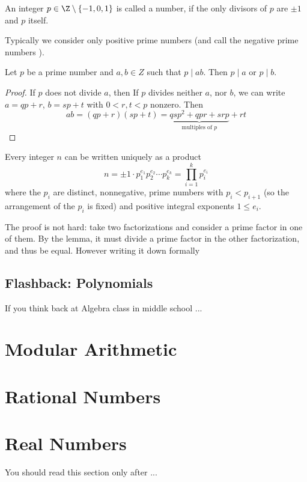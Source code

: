 \begin{defn}
An integer $p\in\Z\setminus\{-1,0,1\}$ is called a  number, if
the only divisors of $p$ are $\pm 1$ and $p$ itself.
\end{defn}
Typically we consider only positive prime numbers (and call the negative
prime numbers ).
\begin{lemma}
Let $p$ be a prime number and $a,b\in Z$ such that $p\mid ab$. Then $p\mid
a$ or $p\mid b$.
\end{lemma}
\begin{proof}
If $p$ does not divide $a$, then
If $p$ divides neither $a$, nor $b$, we can write $a=qp+r$, $b=sp+t$ with
$0<r,t<p$ nonzero. Then
\[
ab=(qp+r)(sp+t)=\underbrace{qsp^2+qpr+srp}_{\mbox{multiples of $p$}}+rt
\]
\end{proof}
\begin{cor}
Every integer $n$ can be written uniquely as a product
\[
n=\pm1\cdot p_1^{e_1}p_2^{e_2}\cdots p_k^{e_k}=\prod_{i=1}^k p_i^{e_i}
\]
where the $p_i$ are distinct, nonnegative, prime numbers with $p_i<p_{i+1}$
(so the arrangement of the $p_i$ is fixed) and positive integral exponents
$1\le e_i$.
\end{cor}
The proof is not hard: take two factorizations and consider a prime factor
in one of them. By the lemma, it must divide a prime factor in the other
factorization, and thus be equal. However writing it down formally 



\subsection{Flashback: Polynomials}
\bonussection

If you think back at Algebra class in middle school ...

\section{Modular Arithmetic}

\section{Rational Numbers}

\section{Real Numbers}

You should read this section only after ...

